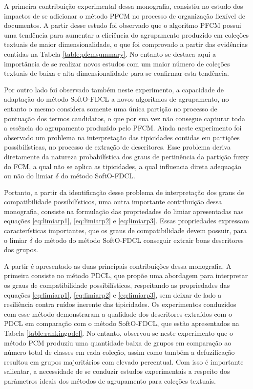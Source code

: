 A primeira contribuição experimental dessa monografia, consistiu no estudo dos impactos de se
adicionar o método PFCM no processo de organização flexível de documentos. A partir desse estudo
foi observado que o algoritmo PFCM possui uma tendência para aumentar a eficiência do
agrupamento produzido em coleções textuais de maior dimensionalidade, o que foi comprovado a partir
das evidências contidas na Tabela \ref{table:pfcmsummary}. No entanto se destaca aqui a importância
de se realizar novos estudos com um maior número de coleções textuais de baixa e alta
dimensionalidade para se confirmar esta tendência. 

Por outro lado foi observado também neste experimento, a capacidade de adaptação do método
SoftO-FDCL a novos algoritmos de agrupamento, no entanto o mesmo considera somente uma única
partição no processo de pontuação dos termos candidatos, o que por sua vez não consegue capturar
toda a essência do agrupamento produzido pelo PFCM. Ainda neste experimento foi observado um
problema na interpretação das tipicidades contidas em partições possibilísticas, no processo de
extração de descritores. Esse problema deriva diretamente da natureza probabilística dos graus de
pertinência da partição fuzzy do FCM, a qual não se aplica as tipicidades, a qual influencia
direta adequação ou não do limiar $\delta$ do método SoftO-FDCL. 

Portanto, a partir da identificação desse problema de interpretação dos graus de compatibilidade
possibilísticos, uma outra importante contribuição dessa monografia, consiste na formulação das
propriedades do limiar apresentadas nas equações \ref{eq:limiarp1}, \ref{eq:limiarp2} e
\ref{eq:limiarp3}. Essas propriedades expressam características importantes, que os graus de
compatibilidade devem possuir, para o limiar $\delta$ do método do método SoftO-FDCL conseguir
extrair bons descritores dos grupos. 

A partir é apresentado as duas principais contribuições dessa monografia. A primeira consiste no
método PDCL, que propõe uma abordagem para interpretar os graus de compatibilidade possibilísticos,
respeitando as propriedades das equações \ref{eq:limiarp1}, \ref{eq:limiarp2} e \ref{eq:limiarp3},
sem deixar de lado a resiliência contra ruídos inerente das tipicidades. Os experimentos conduzidos
com esse método demonstraram a qualidade dos descritores extraídos com o PDCL em comparação com o
método SoftO-FDCL, que estão apresentados na Tabela \ref{table:rankingpdcl}. No entanto, observou-se
neste experimento que o método PCM produziu uma quantidade baixa de grupos em comparação ao número
total de classes em cada coleção, assim como também a defuzificação resultou em grupos majoritários
com elevado percentual. Com isso é importante salientar, a necessidade de se conduzir estudos
experimentais a respeito dos parâmetros ideais dos métodos de agrupamento para coleções textuais.

